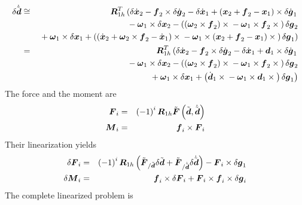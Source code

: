 \documentclass[10pt,dvips,fleqn]{report}
\newcommand{\T}[1]{\boldsymbol{#1}}
\begin{document}
\begin{eqnarray*}
	\delta\dot{\tilde{\T{d}}} & \cong & \T{R}_{1h}^T\lplbr{
		\delta\dot{\T{x}}_2
		- \T{f}_2\times\delta\dot{\T{g}}_2
		- \delta\dot{\T{x}}_1
		+ \plbr{
			\T{x}_2
			+ \T{f}_2
			- \T{x}_1
		}\times\delta\dot{\T{g}}_1
	} \\
	& & \mbox{} - \T{\omega}_1 \times \delta\T{x}_2
		- \plbr{
			\plbr{\T{\omega}_2 \times \T{f}_2}\times{}
			- \T{\omega}_1 \times \T{f}_2 \times{}
		} \delta\T{g}_2 \\
	& & \rplbr{
		\mbox{} + \T{\omega}_1 \times \delta\T{x}_1
		+ \plbr{
			\plbr{
				\dot{\T{x}}_2
				+ \T{\omega}_2 \times  \T{f}_2
				- \dot{\T{x}}_1
			} \times{}
			- \T{\omega}_1 \times \plbr{
				\T{x}_2 + \T{f}_2 - \T{x}_1
			}\times{}
		} \delta\T{g}_1
	} \\
	& = & \T{R}_{1h}^T\lplbr{
		\delta\dot{\T{x}}_2
		- \T{f}_2\times\delta\dot{\T{g}}_2
		- \delta\dot{\T{x}}_1
		+ \T{d}_1\times\delta\dot{\T{g}}_1
	} \\
	& & \mbox{} - \T{\omega}_1 \times \delta\T{x}_2
		- \plbr{
			\plbr{\T{\omega}_2 \times \T{f}_2}\times{}
			- \T{\omega}_1 \times \T{f}_2 \times{}
		} \delta\T{g}_2 \\
	& & \rplbr{
		\mbox{} + \T{\omega}_1 \times \delta\T{x}_1
		+ \plbr{
			\dot{\T{d}}_1\times{}
			- \T{\omega}_1\times\T{d}_1\times{}
		} \delta\T{g}_1
	}
\end{eqnarray*}
The force and the moment are
\begin{eqnarray*}
	\T{F}_i & = & \plbr{ -1 }^i \T{R}_{1h} \tilde{\T{F}}\plbr{\tilde{\T{d}}, \dot{\tilde{\T{d}}}} \\
	\T{M}_i & = & \T{f}_i \times \T{F}_i
\end{eqnarray*}
Their linearization yields
\begin{eqnarray*}
	\delta\T{F}_i & = & \plbr{ -1 }^i \T{R}_{1h} \plbr{
		\tilde{\T{F}}_{/\tilde{\T{d}}} \delta{\tilde{\T{d}}}
		+ \tilde{\T{F}}_{/\dot{\tilde{\T{d}}}} \delta\dot{\tilde{\T{d}}}
	} - \T{F}_i \times \delta\T{g}_1 \\
	\delta\T{M}_i & = & \T{f}_i \times \delta\T{F}_i + \T{F}_i \times \T{f}_i \times \delta\T{g}_i
\end{eqnarray*}
The complete linearized problem is
\end{document}
